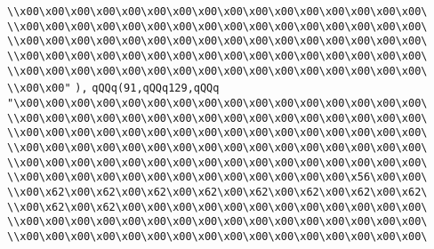 \verb|\\x00\x00\x00\x00\x00\x00\x00\x00\x00\x00\x00\x00\x00\x00\x00\x00\|\newline
\verb|\\x00\x00\x00\x00\x00\x00\x00\x00\x00\x00\x00\x00\x00\x00\x00\x00\|\newline
\verb|\\x00\x00\x00\x00\x00\x00\x00\x00\x00\x00\x00\x00\x00\x00\x00\x00\|\newline
\verb|\\x00\x00\x00\x00\x00\x00\x00\x00\x00\x00\x00\x00\x00\x00\x00\x00\|\newline
\verb|\\x00\x00\x00\x00\x00\x00\x00\x00\x00\x00\x00\x00\x00\x00\x00\x00\|\newline
\verb|\\x00\x00"|\newline
\verb|),|\newline
\verb|qQQq(91,qQQq129,qQQq|\newline
\verb|"\x00\x00\x00\x00\x00\x00\x00\x00\x00\x00\x00\x00\x00\x00\x00\x00\|\newline
\verb|\\x00\x00\x00\x00\x00\x00\x00\x00\x00\x00\x00\x00\x00\x00\x00\x00\|\newline
\verb|\\x00\x00\x00\x00\x00\x00\x00\x00\x00\x00\x00\x00\x00\x00\x00\x00\|\newline
\verb|\\x00\x00\x00\x00\x00\x00\x00\x00\x00\x00\x00\x00\x00\x00\x00\x00\|\newline
\verb|\\x00\x00\x00\x00\x00\x00\x00\x00\x00\x00\x00\x00\x00\x00\x00\x00\|\newline
\verb|\\x00\x00\x00\x00\x00\x00\x00\x00\x00\x00\x00\x00\x00\x56\x00\x00\|\newline
\verb|\\x00\x62\x00\x62\x00\x62\x00\x62\x00\x62\x00\x62\x00\x62\x00\x62\|\newline
\verb|\\x00\x62\x00\x62\x00\x00\x00\x00\x00\x00\x00\x00\x00\x00\x00\x00\|\newline
\verb|\\x00\x00\x00\x00\x00\x00\x00\x00\x00\x00\x00\x00\x00\x00\x00\x00\|\newline
\verb|\\x00\x00\x00\x00\x00\x00\x00\x00\x00\x00\x00\x00\x00\x00\x00\x00\|\newline
